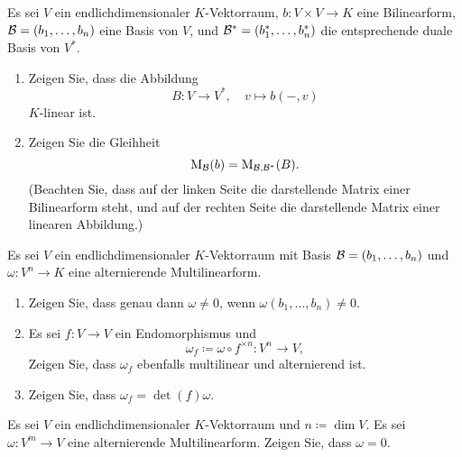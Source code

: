 \documentclass[a4paper,10pt]{scrartcl}
\begin{document}
\begin{question}
  Es sei $V$ ein endlichdimensionaler $K$-Vektorraum, $b \colon V \times V \to K$ eine Bilinearform, $\mathcal{B} = (b_1, \dotsc, b_n)$ eine Basis von $V$, und $\mathcal{B}^* = (b_1^*, \dotsc, b_n^*)$ die entsprechende duale Basis von $V^*$.
  \begin{enumerate}[leftmargin=*]
    \item
      Zeigen Sie, dass die Abbildung
      \[
        B \colon V \to V^*,
        \quad
        v \mapsto b(-,v)
      \]
      $K$-linear ist.
    \item
      Zeigen Sie die Gleihheit
      \[
        \operatorname{M}_{\mathcal{B}}(b) = \operatorname{M}_{\mathcal{B}, \mathcal{B}^*}(B).
      \]
      (Beachten Sie, dass auf der linken Seite die darstellende Matrix einer Bilinearform steht, und auf der rechten Seite die darstellende Matrix einer linearen Abbildung.)
  \end{enumerate}
\end{question}












\begin{question}
  Es sei $V$ ein endlichdimensionaler $K$-Vektorraum mit Basis $\mathcal{B} = (b_1, \dotsc, b_n)$ und $\omega \colon V^n \to K$ eine alternierende Multilinearform.
  \begin{enumerate}
    \item
      Zeigen Sie, dass genau dann $\omega \neq 0$, wenn $\omega(b_1, \dotsc, b_n) \neq 0$.
    \item
      Es sei $f \colon V \to V$ ein Endomorphismus und
      \[
        \omega_f \coloneqq \omega \circ f^{\times n} \colon V^n \to V,
      \]
      Zeigen Sie, dass $\omega_f$ ebenfalls multilinear und alternierend ist.
    \item
      Zeigen Sie, dass $\omega_f = \det(f) \omega$.
  \end{enumerate}
\end{question}


\begin{question}
  Es sei $V$ ein endlichdimensionaler $K$-Vektorraum und $n \coloneqq \dim V$.
  Es sei $\omega \colon V^m \to V$ eine alternierende Multilinearform.
  Zeigen Sie, dass $\omega = 0$.
\end{question}
\end{document}
